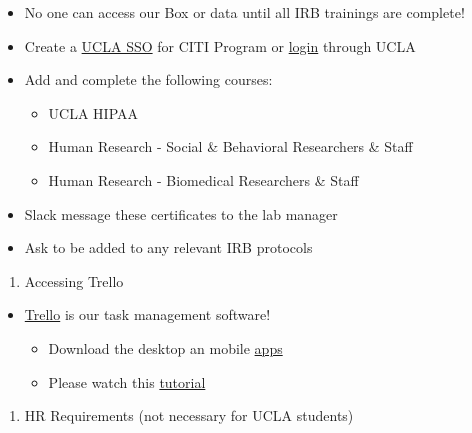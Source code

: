 \documentclass[]{book}
\providecommand{\tightlist}{%
  \setlength{\itemsep}{0pt}\setlength{\parskip}{0pt}}
\begin{document}
\begin{itemize}
\tightlist
\item
  No one can access our Box or data until all IRB trainings are
  complete!
\item
  Create a
  \href{https://ora.research.ucla.edu/OHRPP/Documents/Education/SSO_CITI_New_Acct.pdf}{UCLA
  SSO} for CITI Program or
  \href{https://www.research.ucla.edu/CITIProgram/}{login} through UCLA
\item
  Add and complete the following courses:

  \begin{itemize}
  \tightlist
  \item
    UCLA HIPAA
  \item
    Human Research - Social \& Behavioral Researchers \& Staff
  \item
    Human Research - Biomedical Researchers \& Staff
  \end{itemize}
\item
  Slack message these certificates to the lab manager
\item
  Ask to be added to any relevant IRB protocols
\end{itemize}

\begin{enumerate}
\def\labelenumi{\arabic{enumi}.}
\setcounter{enumi}{2}
\tightlist
\item
  Accessing Trello
\end{enumerate}

\begin{itemize}
\tightlist
\item
  \href{https://trello.com}{Trello} is our task management software!

  \begin{itemize}
  \tightlist
  \item
    Download the desktop an mobile
    \href{https://trello.com/en-US/platforms}{apps}
  \item
    Please watch this \href{https://youtu.be/_Ry-SnJygy8}{tutorial}
  \end{itemize}
\end{itemize}

\begin{enumerate}
\def\labelenumi{\arabic{enumi}.}
\setcounter{enumi}{3}
\tightlist
\item
  HR Requirements (not necessary for UCLA students)
\end{enumerate}
\end{document}
